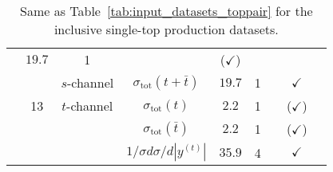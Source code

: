 \begin{table}[t]
\begin{center}
{\begin{tabular}{lcccccc|c|c}
    & $19.7$
    & 1
    & \cite{Khachatryan:2014iya}
     & ($\checkmark$)
     & \\
    & 
    & $s$-channel
    & $\sigma_{\text{tot}}(t + \bar{t})$
    & $19.7$
    & 1
    & \cite{Khachatryan:2016ewo}  
     & $\checkmark$
      & \\
      \midrule
    & 13
    & $t$-channel
    & $\sigma_{\text{tot}}(t)$
    & $2.2$
    & 1
    & \cite{Sirunyan:2016cdg} 
        & ($\checkmark$)
     & \\
    &
    & 
    & $\sigma_{\text{tot}}(\bar{t})$
    & $2.2$
    & 1
    & \cite{Sirunyan:2016cdg} 
      & ($\checkmark$)
     & \\
    &
    & 
    & $1/\sigma d\sigma/d|y^{(t)}|$
    & $35.9$
    & 4
    & \cite{Sirunyan:2019hqb}
     & $\checkmark$
     & \\
\bottomrule
   \end{tabular}
   \vspace{0.3cm}
  \caption{\small Same as Table~\ref{tab:input_datasets_toppair} for
    the inclusive single-top production datasets.
     \label{tab:input_datasets_3}
   }
}
\end{center}
\end{table}



